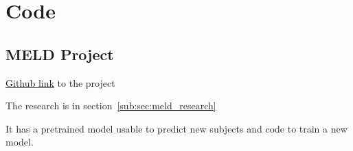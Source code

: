 \chapter{Code}

\section{MELD Project}
\label{sub:sec:meld_github}

\href{https://github.com/MELDProject/meld_classifier}{Github link} to the project

The research is in section~\ref{sub:sec:meld_research}

It has a pretrained model usable to predict new subjects and code to train a new model.
